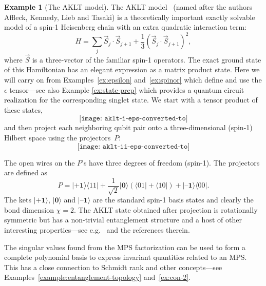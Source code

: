 \documentclass[aps,pra,12pt,nofootinbib,superscriptaddress,longbibliography]{revtex4-1}
\theoremstyle{plain}
\theoremstyle{definition}
\newtheorem{example}[theorem]{Example}
\newcommand{\bra}[1]{\mbox{$\langle #1|$}}
\newcommand{\ket}[1]{\mbox{$|#1\rangle$}}
\newcommand{\be}{\begin{equation}}
\newcommand{\ee}{\end{equation}}
\begin{document}
\begin{example}[The AKLT model] \label{ex:AKLT} 
The AKLT model~\cite{1987PhRvL..59..799A} (named after the authors Affleck, Kennedy, Lieb and Tasaki)
is a theoretically important exactly solvable model of a spin-1 Heisenberg chain with an extra
quadratic interaction term:
\be
H = \sum_j \vec{S}_j \cdot \vec{S}_{j+1} + \frac{1}{3} (\vec{S}_j \cdot \vec{S}_{j+1})^2,
\ee
where $\vec{S}$ is a three-vector of the familiar spin-1 operators.
The exact ground state of this Hamiltonian
has an elegant expression as a matrix product state.
Here we will carry on from Examples~\ref{ex:epsilon} and~\ref{ex:spinor}
which define and use the $\epsilon$ tensor---see also Example \ref{ex:state-prep} which provides a quantum circuit realization for the corresponding singlet state.
We start with a tensor product of these states,
\be 
\texttt{[image: aklt-i-eps-converted-to]}
\ee
and then project each neighboring qubit pair onto a three-dimensional (spin-1) Hilbert space using the projectors~$P$:
\be
\texttt{[image: aklt-ii-eps-converted-to]}
\ee
 
The open wires on the $P$'s have three degrees of freedom (spin-1).  The projectors are defined as 
\be \label{eqn:projaklt}
P = \ket{\textbf{+1}}\bra{11} + \frac{1}{\sqrt{2}} \ket{\textbf{0}}(\bra{01}+\bra{10})+\ket{\textbf{--1}}\bra{00}.
 \ee
The kets $\ket{\textbf{+1}}$, $\ket{\textbf{0}}$ and $\ket{\textbf{--1}}$ are the standard spin-1 basis states and clearly the bond dimension $\chi=2$.
The AKLT state obtained after projection is rotationally symmetric but has a non-trivial entanglement structure and a host of other interesting properties---see e.g.~\cite{2014AnPhy.349..117O} and the references therein.


\end{example}

The singular values found from the MPS factorization can be used to form a complete polynomial basis to express invariant quantities related to an MPS.
This has a close connection to Schmidt rank and other concepts---see Examples~\ref{example:entanglement-topology} and~\ref{ex:con-2}.
\end{document}
